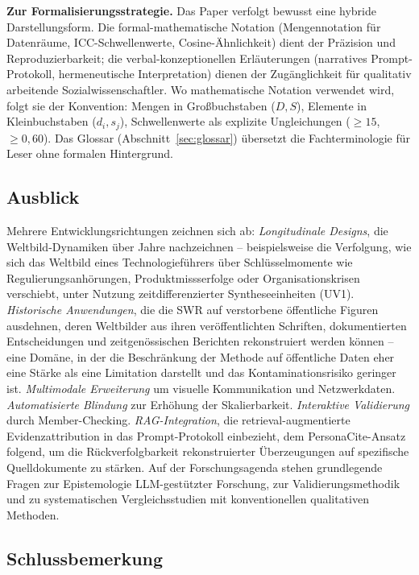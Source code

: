 \documentclass[11pt,a4paper]{article}
\theoremstyle{definition}
\theoremstyle{plain}
\theoremstyle{remark}
\begin{document}
\textbf{Zur Formalisierungsstrategie.} Das Paper verfolgt bewusst eine hybride Darstellungsform. Die formal-mathematische Notation (Mengennotation f\"ur Datenr\"aume, ICC-Schwellenwerte, Cosine-\"Ahnlichkeit) dient der Pr\"azision und Reproduzierbarkeit; die verbal-konzeptionellen Erl\"auterungen (narratives Prompt-Protokoll, hermeneutische Interpretation) dienen der Zugänglichkeit f\"ur qualitativ arbeitende Sozialwissenschaftler. Wo mathematische Notation verwendet wird, folgt sie der Konvention: Mengen in Gro\ss{}buchstaben ($D, S$), Elemente in Kleinbuchstaben ($d_i, s_j$), Schwellenwerte als explizite Ungleichungen ($\geq 15$, $\geq 0{,}60$). Das Glossar (Abschnitt~\ref{sec:glossar}) \"ubersetzt die Fachterminologie f\"ur Leser ohne formalen Hintergrund.

\subsection{Ausblick}

Mehrere Entwicklungsrichtungen zeichnen sich ab: \emph{Longitudinale Designs}, die Weltbild-Dynamiken \"uber Jahre nachzeichnen -- beispielsweise die Verfolgung, wie sich das Weltbild eines Technologief\"uhrers \"uber Schl\"usselmomente wie Regulierungsanh\"orungen, Produktmissserfolge oder Organisationskrisen verschiebt, unter Nutzung zeitdifferenzierter Syntheseeinheiten (UV1). \emph{Historische Anwendungen}, die die SWR auf verstorbene \"offentliche Figuren ausdehnen, deren Weltbilder aus ihren ver\"offentlichten Schriften, dokumentierten Entscheidungen und zeitgen\"ossischen Berichten rekonstruiert werden k\"onnen -- eine Dom\"ane, in der die Beschr\"ankung der Methode auf \"offentliche Daten eher eine St\"arke als eine Limitation darstellt und das Kontaminationsrisiko geringer ist. \emph{Multimodale Erweiterung} um visuelle Kommunikation und Netzwerkdaten. \emph{Automatisierte Blindung} zur Erh\"ohung der Skalierbarkeit. \emph{Interaktive Validierung} durch Member-Checking. \emph{RAG-Integration}, die retrieval-augmentierte Evidenzattribution in das Prompt-Protokoll einbezieht, dem PersonaCite-Ansatz \citep{PersonaCite2026} folgend, um die R\"uckverfolgbarkeit rekonstruierter \"Uberzeugungen auf spezifische Quelldokumente zu st\"arken. Auf der Forschungsagenda stehen grundlegende Fragen zur Epistemologie LLM-gest\"utzter Forschung, zur Validierungsmethodik und zu systematischen Vergleichsstudien mit konventionellen qualitativen Methoden.

\subsection{Schlussbemerkung}
\end{document}
